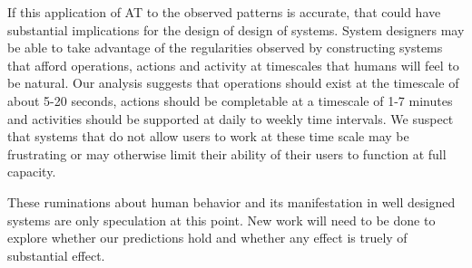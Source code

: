 If this application of AT to the observed patterns is accurate, that could have substantial implications for the design of design of systems.  System designers may be able to take advantage of the regularities observed by constructing systems that afford operations, actions and activity at timescales that humans will feel to be natural.  Our analysis suggests that operations should exist at the timescale of about 5-20 seconds, actions should be completable at a timescale of 1-7 minutes and activities should be supported at daily to weekly time intervals.  We suspect that systems that do not allow users to work at these time scale may be frustrating or may otherwise limit their ability of their users to function at full capacity.

These ruminations about human behavior and its manifestation in well designed systems are only speculation at this point.  New work will need to be done to explore whether our predictions hold and whether any effect is truely of substantial effect.  
